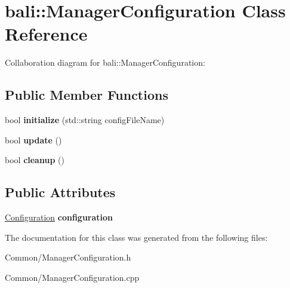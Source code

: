 \hypertarget{classbali_1_1_manager_configuration}{\section{bali\-:\-:Manager\-Configuration Class Reference}
\label{classbali_1_1_manager_configuration}
}


Collaboration diagram for bali\-:\-:Manager\-Configuration\-:
\subsection*{Public Member Functions}
\begin{DoxyCompactItemize}
\item 
\hypertarget{classbali_1_1_manager_configuration_ad71f274e4698707eb78305476f2c2f23}{bool {\bfseries initialize} (std\-::string config\-File\-Name)}\label{classbali_1_1_manager_configuration_ad71f274e4698707eb78305476f2c2f23}

\item 
\hypertarget{classbali_1_1_manager_configuration_a92d615bb5d1e703caa55520026990777}{bool {\bfseries update} ()}\label{classbali_1_1_manager_configuration_a92d615bb5d1e703caa55520026990777}

\item 
\hypertarget{classbali_1_1_manager_configuration_a784f5803924bf7d9d446a6a85edb6e8e}{bool {\bfseries cleanup} ()}\label{classbali_1_1_manager_configuration_a784f5803924bf7d9d446a6a85edb6e8e}

\end{DoxyCompactItemize}
\subsection*{Public Attributes}
\begin{DoxyCompactItemize}
\item 
\hypertarget{classbali_1_1_manager_configuration_a140d14bbcf3f3ac42238aeea269fc900}{\hyperlink{classbali_1_1_configuration}{Configuration} {\bfseries configuration}}\label{classbali_1_1_manager_configuration_a140d14bbcf3f3ac42238aeea269fc900}

\end{DoxyCompactItemize}


The documentation for this class was generated from the following files\-:\begin{DoxyCompactItemize}
\item 
Common/Manager\-Configuration.\-h\item 
Common/Manager\-Configuration.\-cpp\end{DoxyCompactItemize}
